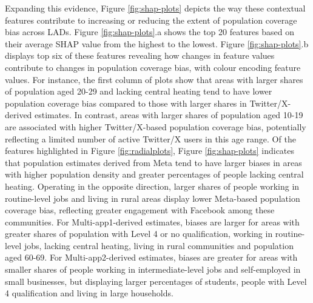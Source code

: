 \documentclass[]{rsos}%
\begin{document}
Expanding this evidence, Figure \ref{fig:shap-plots} depicts the way
these contextual features contribute to increasing or reducing the
extent of population coverage bias across LADs. Figure
\ref{fig:shap-plots}.a shows the top 20 features based on their average
SHAP value from the highest to the lowest. Figure \ref{fig:shap-plots}.b
displays top six of these features revealing how changes in feature
values contribute to changes in population coverage bias, with colour
encoding feature values. For instance, the first column of plots show
that areas with larger shares of population aged 20-29 and lacking
central heating tend to have lower population coverage bias compared to
those with larger shares in Twitter/X-derived estimates. In contrast,
areas with larger shares of population aged 10-19 are associated with
higher Twitter/X-based population coverage bias, potentially reflecting
a limited number of active Twitter/X users in this age range. Of the
features highlighted in Figure \ref{fig:radialplots}, Figure
\ref{fig:shap-plots} indicates that population estimates derived from
Meta tend to have larger biases in areas with higher population density
and greater percentages of people lacking central heating. Operating in
the opposite direction, larger shares of people working in routine-level
jobs and living in rural areas display lower Meta-based population
coverage bias, reflecting greater engagement with Facebook among these
communities. For Multi-app1-derived estimates, biases are larger for
areas with greater shares of population with Level 4 or no
qualification, working in routine-level jobs, lacking central heating,
living in rural communities and population aged 60-69. For
Multi-app2-derived estimates, biases are greater for areas with smaller
shares of people working in intermediate-level jobs and self-employed in
small businesses, but displaying larger percentages of students, people
with Level 4 qualification and living in large households.
\end{document}
